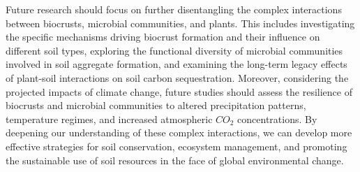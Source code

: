 Future research should focus on further disentangling the complex interactions between biocrusts, microbial communities, and plants. This includes investigating the specific mechanisms driving biocrust formation and their influence on different soil types, exploring the functional diversity of microbial communities involved in soil aggregate formation, and examining the long-term legacy effects of plant-soil interactions on soil carbon sequestration. Moreover, considering the projected impacts of climate change, future studies should assess the resilience of biocrusts and microbial communities to altered precipitation patterns, temperature regimes, and increased atmospheric $CO_2$ concentrations. By deepening our understanding of these complex interactions, we can develop more effective strategies for soil conservation, ecosystem management, and promoting the sustainable use of soil resources in the face of global environmental change.
